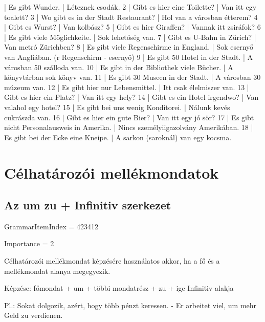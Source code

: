 \documentclass{article}
\newenvironment{desc}{\verbatim}{\endverbatim}
\newenvironment{exmp}{\verbatim}{\endverbatim}
\begin{document}
\begin{exmp}
1 | Es gibt Wunder. | Léteznek csodák.
2 | Gibt es hier eine Toilette? | Van itt egy toalett?
3 | Wo gibt es in der Stadt Restaurant? | Hol van a városban étterem?
4 | Gibt es Wurst? | Van kolbász?
5 | Gibt es hier Giraffen? | Vannak itt zsiráfok?
6 | Es gibt viele Möglichkeite. | Sok lehetőség van.
7 | Gibt es U-Bahn in Zürich? | Van metró Zürichben?
8 | Es gibt viele Regenschirme in England. | Sok esernyő van Angliában. (r Regenschirm - esernyő)
9 | Es gibt 50 Hotel in der Stadt. | A városban 50 szálloda van.
10 | Es gibt in der Bibliothek viele Bücher. | A könyvtárban sok könyv van.
11 | Es gibt 30 Museen in der Stadt. | A városban 30 múzeum van.
12 | Es gibt hier nur Lebensmittel. | Itt csak élelmiszer van.
13 | Gibt es hier ein Platz? | Van itt egy hely?
14 | Gibt es ein Hotel irgendwo? | Van valahol egy hotel?
15 | Es gibt bei uns wenig Konditorei. | Nálunk kevés cukrászda van.
16 | Gibt es hier ein gute Bier? | Van itt egy jó sör?
17 | Es gibt nicht Personalausweis in Amerika. | Nincs személyiigazolvány Amerikában.
18 | Es gibt bei der Ecke eine Kneipe. | A sarkon (saroknál) van egy kocsma.
\end{exmp}

\section{Célhatározói mellékmondatok}

\subsection{Az um zu + Infinitiv szerkezet}

GrammarItemIndex = 423412

Importance = 2

\begin{desc}
Célhatározói mellékmondat képzésére használatos akkor, ha a fő és a mellékmondat alanya megegyezik.

Képzése:
főmondat + um + többi mondatrész + zu + ige Infinitiv alakja

Pl.: Sokat dolgozik, azért, hogy több pénzt keressen. - Er arbeitet viel, um mehr Geld zu verdienen.
\end{desc}
\end{document}
